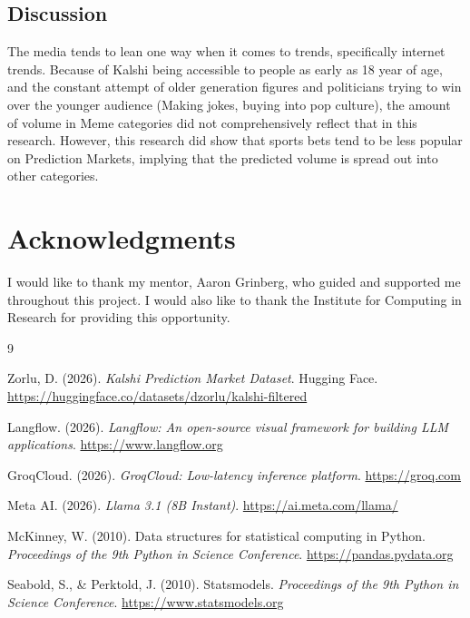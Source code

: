 \documentclass{article}
\begin{document}
\subsection{Discussion}
The media tends to lean one way when it comes to trends, specifically internet trends. Because of Kalshi being accessible to people as early as 18 year of age, and the constant attempt of older generation figures and politicians trying to win over the younger audience (Making jokes, buying into pop culture), the amount of volume in Meme categories did not comprehensively reflect that in this research. However, this research did show that sports bets tend to be less popular on Prediction Markets, implying that the predicted volume is spread out into other categories. 

\section{Acknowledgments}

I would like to thank my mentor, Aaron Grinberg, who guided and supported me throughout this
project. I would also like to thank the Institute for Computing in Research for providing this opportunity. 


\begin{thebibliography}{9}

	Zorlu, D. (2026).
	\newblock \emph{Kalshi Prediction Market Dataset}.
	\newblock Hugging Face.
	\newblock \url{https://huggingface.co/datasets/dzorlu/kalshi-filtered}

	Langflow. (2026).
	\newblock \emph{Langflow: An open-source visual framework for building LLM applications}.
	\newblock \url{https://www.langflow.org}

	GroqCloud. (2026).
	\newblock \emph{GroqCloud: Low-latency inference platform}.
	\newblock \url{https://groq.com}

	Meta AI. (2026).
	\newblock \emph{Llama 3.1 (8B Instant)}.
	\newblock \url{https://ai.meta.com/llama/}

	McKinney, W. (2010).
	\newblock Data structures for statistical computing in Python.
	\newblock \emph{Proceedings of the 9th Python in Science Conference}.
	\newblock \url{https://pandas.pydata.org}

	Seabold, S., \& Perktold, J. (2010).
	\newblock Statsmodels.
	\newblock \emph{Proceedings of the 9th Python in Science Conference}.
	\newblock \url{https://www.statsmodels.org}

\end{thebibliography}
\end{document}
